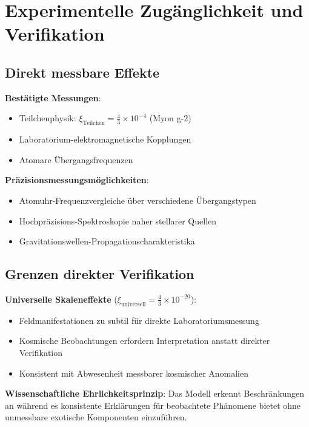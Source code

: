 \documentclass[12pt,a4paper]{article}
\begin{document}
	\section{Experimentelle Zug\"anglichkeit und Verifikation}
	\label{sec:experimental_verification}
	
	\subsection{Direkt messbare Effekte}
	\label{subsec:directly_measurable}
	
	\textbf{Best\"atigte Messungen}:
	\begin{itemize}
		\item Teilchenphysik: $\xi_{\text{Teilchen}} = \frac{4}{3} \times 10^{-4}$ (Myon g-2)
		\item Laboratorium-elektromagnetische Kopplungen
		\item Atomare \"Ubergangsfrequenzen
	\end{itemize}
	
	\textbf{Pr\"azisionsmessungsm\"oglichkeiten}:
	\begin{itemize}
		\item Atomuhr-Frequenzvergleiche \"uber verschiedene \"Ubergangstypen
		\item Hochpr\"azisions-Spektroskopie naher stellarer Quellen
		\item Gravitationswellen-Propagationscharakteristika
	\end{itemize}
	
	\subsection{Grenzen direkter Verifikation}
	\label{subsec:verification_limits}
	
	\textbf{Universelle Skaleneffekte} ($\xi_{\text{universell}} = \frac{4}{3} \times 10^{-20}$):
	\begin{itemize}
		\item Feldmanifestationen zu subtil f\"ur direkte Laboratoriumsmessung
		\item Kosmische Beobachtungen erfordern Interpretation anstatt direkter Verifikation
		\item Konsistent mit Abwesenheit messbarer kosmischer Anomalien
	\end{itemize}
	
	\textbf{Wissenschaftliche Ehrlichkeitsprinzip}:
	Das Modell erkennt Beschr\"ankungen an w\"ahrend es konsistente Erkl\"arungen f\"ur beobachtete Ph\"anomene bietet ohne unmessbare exotische Komponenten einzuf\"uhren.
	
\end{document}
